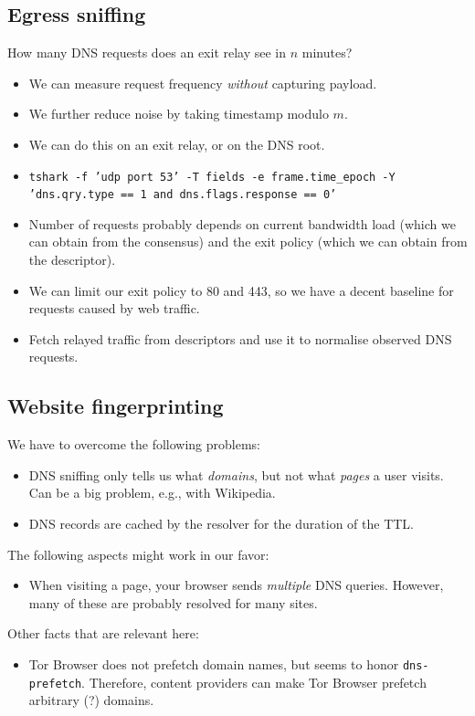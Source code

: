 \subsection{Egress sniffing}

How many DNS requests does an exit relay see in $n$ minutes?
\begin{itemize}
	\item We can measure request frequency \emph{without} capturing payload.
	\item We further reduce noise by taking timestamp modulo $m$.
	\item We can do this on an exit relay, or on the DNS root.
	\item \texttt{tshark -f 'udp port 53' -T fields -e frame.time\_epoch -Y 'dns.qry.type == 1 and dns.flags.response == 0'}
	\item Number of requests probably depends on current bandwidth load (which
		we can obtain from the consensus) and the exit policy (which we can
		obtain from the descriptor).
	\item We can limit our exit policy to 80 and 443, so we have a decent
		baseline for requests caused by web traffic.
	\item Fetch relayed traffic from descriptors and use it to normalise
		observed DNS requests.
\end{itemize}

\subsection{Website fingerprinting}
We have to overcome the following problems:
\begin{itemize}
	\item DNS sniffing only tells us what \emph{domains}, but not what
		\emph{pages} a user visits.  Can be a big problem, e.g., with Wikipedia.
	\item DNS records are cached by the resolver for the duration of the TTL.
\end{itemize}

The following aspects might work in our favor:
\begin{itemize}
	\item When visiting a page, your browser sends \emph{multiple} DNS queries.
		However, many of these are probably resolved for many sites.
\end{itemize}

Other facts that are relevant here:
\begin{itemize}
	\item Tor Browser does not prefetch domain names, but seems to honor
		\texttt{dns-prefetch}.  Therefore, content providers can make Tor
		Browser prefetch arbitrary (?) domains.
\end{itemize}
